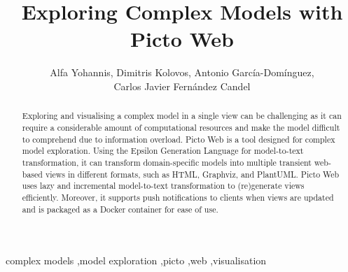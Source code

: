 \documentclass[preprint,12pt, a4paper]{elsarticle}
\begin{document}
\begin{frontmatter}



\title{Exploring Complex Models with Picto Web}


\author{Alfa Yohannis, Dimitris Kolovos, Antonio García-Domínguez,\\
	Carlos Javier Fernández Candel}

\address{University of York, United Kingdom}

\begin{abstract}
Exploring and visualising a complex model in a single view can be challenging as it can require a considerable amount of computational resources and make the model difficult to comprehend due to information overload.
Picto Web is a tool designed for complex model exploration. Using the Epsilon Generation Language for model-to-text transformation, it can transform domain-specific models into multiple transient web-based views in different formats, such as HTML, Graphviz, and PlantUML. 
Picto Web uses lazy and incremental model-to-text transformation to (re)generate views efficiently. 
Moreover, it supports push notifications to clients when views are updated and is packaged as a Docker container for ease of use.
\end{abstract}

\begin{keyword}
complex models \sep model exploration \sep picto \sep web \sep visualisation
\end{keyword}

\end{frontmatter}
\end{document}
